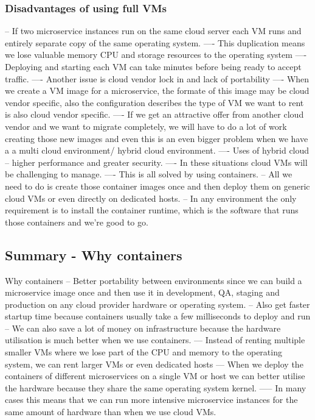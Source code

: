 \documentclass[a4paper, 11pt]{book}
\begin{document}
    \subsubsection{Disadvantages of using full VMs}
    -- If two microservice instances run on the same cloud server each VM runs and entirely separate copy of the same operating system.
    ---- This duplication means we lose valuable memory CPU and storage resources to the operating system
    ---- Deploying and starting each VM can take minutes before being ready to accept traffic.
    ---- Another issue is cloud vendor lock in and lack of portability
    ---- When we create a VM image for a microservice,  the formate of this image may be cloud vendor specific, also the configuration describes the type of VM we want to rent is also cloud vendor specific.
    ---- If we get an attractive offer from another cloud vendor and we want to migrate completely, we will have to do a lot of work creating those new images and even this is an even bigger problem when we have a a multi cloud environment/ hybrid cloud environment.
    ---- Uses of hybrid cloud -- higher performance and greater security.
    ---- In these situations cloud VMs will be challenging to manage.
    ---- This is all solved by using containers.
    -- All we need to do is create those container images once and then deploy them on generic cloud VMs or even directly on dedicated hosts.
    -- In any environment the only requirement is to install the container runtime, which is the software that runs those containers and we're good to go.

    \subsection{Summary - Why containers}
    Why containers
    -- Better portability between environments since we can build a microservice image once and then use it in development, QA, staging and production on any cloud provider hardware or operating system.
    -- Also get faster startup time because containers usually take a few milliseconds to deploy and run
    -- We can also save a lot of money on infrastructure because the hardware utilisation is much better when we use containers.
    --- Instead of renting multiple smaller VMs where we lose part of the CPU and memory to the operating system, we can rent larger VMs or even dedicated hosts
    --- When we deploy the containers of different microservices on a single VM or host we can better utilise the hardware because they share the same operating system kernel.
    ----- In many cases this means that we can run more intensive microservice instances for the same amount of hardware than when we use cloud VMs.
\end{document}

